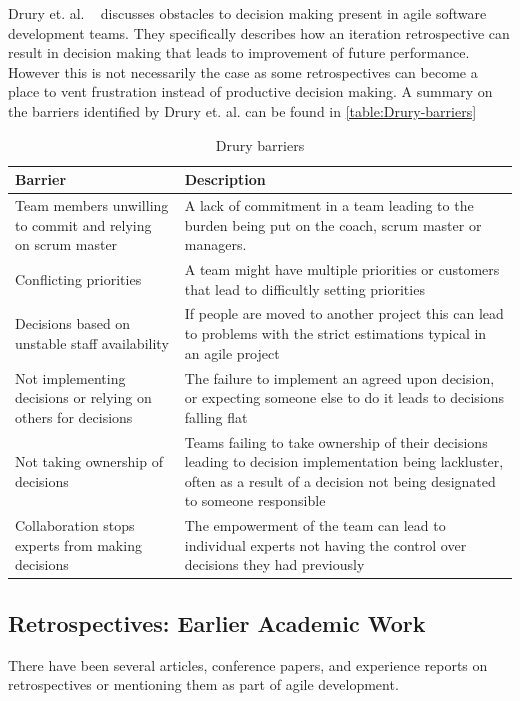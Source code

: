 Drury et. al. ~\cite{Drury2012} discusses obstacles to decision making present in agile software development teams. They specifically describes how an iteration retrospective can result in decision making that leads to improvement of future performance. However this is not necessarily the case as some retrospectives can become a place to vent frustration instead of productive decision making. A summary on the barriers identified by Drury et. al. can be found in \autoref{table:Drury-barriers}


\begin{table}[h]
	\begin{center}
		\caption{Drury barriers}
		\label{table:Drury-barriers}
		\begin{tabular}{ p{} | p{}}
			\hline
			Barrier & Description \\
			\hline
			Team members unwilling to commit and relying on scrum master & A lack of commitment in a team leading to the burden being put on the coach, scrum master or managers. \\
			Conflicting priorities & A team might have multiple priorities or customers that lead to difficultly setting priorities \\
			Decisions based on unstable staff availability & If people are moved to another project this can lead to problems with the strict estimations typical in an agile project \\
			Not implementing decisions or relying on others for decisions & The failure to implement an agreed upon decision, or expecting someone else to do it leads to decisions falling flat \\
			Not taking ownership of decisions & Teams failing to take ownership of their decisions leading to decision implementation being lackluster, often as a result of a decision not being designated to someone responsible\\
			Collaboration stops experts from making decisions & The empowerment of the team can lead to individual experts not having the control over decisions they had previously \\
			\hline
		\end{tabular}
	\end{center}
\end{table}

\clearpage

\subsection{Retrospectives: Earlier Academic Work}
There have been several articles, conference papers, and experience reports on retrospectives or mentioning them as part of agile development.

